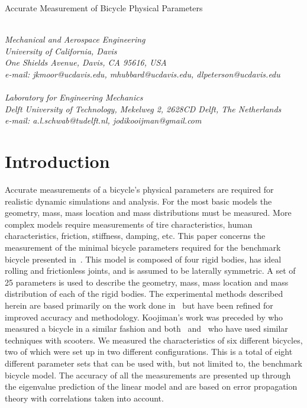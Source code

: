 \documentclass{bmd2010a}
\begin{document}
\begin{flushleft}
{\fontsize{16pt}{20pt}\selectfont%
  Accurate Measurement of Bicycle Physical Parameters\\}
\end{flushleft}

\begin{flushleft}
  {\\}
  \textit{Mechanical and Aerospace Engineering\\
          University of California, Davis\\
          One Shields Avenue, Davis, CA 95616, USA\\
          e-mail: jkmoor@ucdavis.edu, mhubbard@ucdavis.edu,
          dlpeterson@ucdavis.edu
  }\vspace{10pt}\\
  {\\}
  \textit{Laboratory for Engineering Mechanics\\
          Delft University of Technology, Mekelweg 2, 2628CD Delft, The
          Netherlands\\
          e-mail: a.l.schwab@tudelft.nl, jodikooijman@gmail.com
  }\vspace{10pt}\\
\end{flushleft}

\section*{Introduction}
Accurate measurements of a bicycle's physical parameters are required for
realistic dynamic simulations and analysis. For the most basic models the
geometry, mass, mass location and mass distributions must be measured. More complex models
require measurements of tire characteristics, human characteristics, friction, stiffness, damping, etc. This
paper concerns the measurement of the minimal bicycle parameters required for
the benchmark bicycle presented in~\cite{Meijaard2007}. This
model is composed of four rigid bodies, has ideal rolling and frictionless joints,
and is assumed to be laterally symmetric. A set of 25
parameters is used to describe the geometry, mass, mass location and
mass distribution of each of the rigid bodies. The experimental methods
described herein are based primarily on the work
done in~\cite{Kooijman2006} but have been refined for improved accuracy and
methodology. Koojiman's work was preceded by \cite{Roland1971} who measured a bicycle in a
similar fashion and both~\cite{Dohring1953} and~\cite{Singh1971} who have used
similar techniques with scooters. We measured the characteristics of six
different bicycles, two of which were set up in two different configurations.
This is a total of eight different parameter sets that can be used with, but not
limited to, the benchmark bicycle model. The accuracy of all the measurements
are presented up through the eigenvalue prediction of the linear model and are
based on error propagation theory with correlations taken into account.
\end{document}
